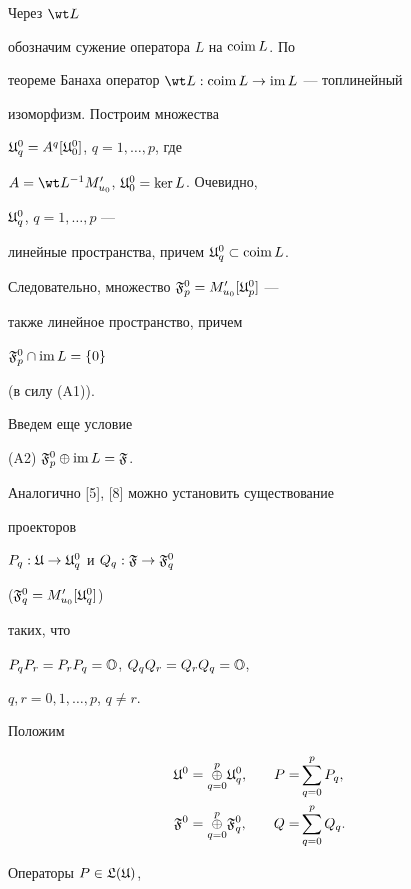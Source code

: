 Через $\wt L$


обозначим сужение оператора $L$ на $\operatorname{coim} L$. По


теореме Банаха оператор $\wt L:\coim L\to\im L$ --- топлинейный


изоморфизм. Построим множества


$\frak U^0_q=A^q[\frak U^0_0]$, $q=1,\dotsc,p$, где


$A=\wt L^{-1}M'_{u_0}$, $\frak U^0_0=\ker L$. Очевидно,


$\frak U^0_q$, $q=1,\dotsc,p$ ---


линейные пространства, причем $\frak U^0_q\subset\operatorname{coim} L$.


Следовательно, множество $\frak F^0_p=M'_{u_0}[\frak U^0_p]$ ---


также линейное пространство, причем


$\frak F^0_p\cap\operatorname{im} L=\{0\}$


(в силу (A1)).





Введем еще условие





(A2) $\frak F^0_p\oplus\operatorname{im} L=\frak F$.





Аналогично [5], [8] можно установить существование


проекторов


$P_q:\frak U\to\frak U^0_q$ и $Q_q:\frak F\to\frak F^0_q$


($\frak F^0_q=M'_{u_0}[\frak U^0_q]$)


таких, что


$P_qP_r=P_rP_q=\Bbb O$, $Q_qQ_r=Q_rQ_q=\Bbb O$,


$q,r=0,1,\dotsc,p$, $q\ne r$.


Положим


\begin{alignat*}{2}


\frak U^0&=\overset{p}{\underset{q=0}{\oplus}}{}\frak U^0_q,


&\quad P=&\sum^p_{q=0}P_q,\\


\frak F^0&=\overset{p}{\underset{q=0}{\oplus}}{}\frak F^0_q,


&\quad Q=&\sum^p_{q=0}Q_q.


\end{alignat*}


Операторы $P\in\frak L(\frak U)$,


